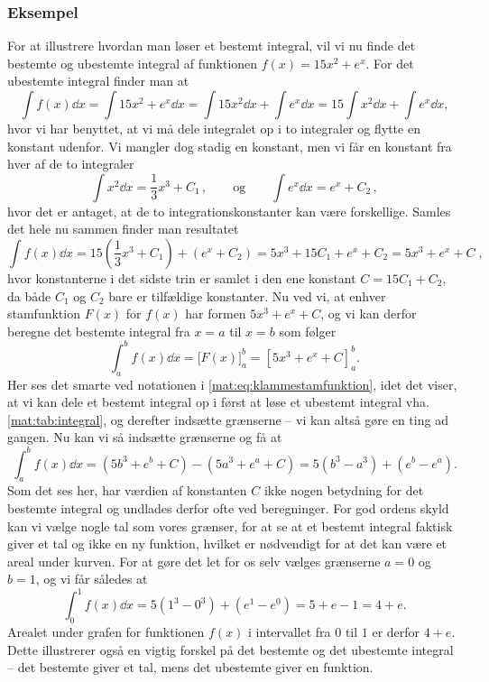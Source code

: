 \subsubsection{Eksempel}
For at illustrere hvordan man løser et bestemt integral, vil vi nu finde det bestemte og ubestemte integral af funktionen $f(x) = 15x^2 + e^x$. For det ubestemte integral finder man at
\begin{equation*}
\int f(x) \dd{x} = \int 15x^2 + e^x \dd{x} = \int 15x^2 \dd{x} + \int e^x \dd{x} = 15 \int x^2 \dd{x} + \int e^x \dd{x},
\end{equation*}
hvor vi har benyttet, at vi må dele integralet op i to integraler og flytte en konstant udenfor. Vi mangler dog stadig en konstant, men vi får en konstant fra hver af de to integraler
\begin{equation*}
\int x^2 \dd{x} = \frac{1}{3} x^3 + C_1 \, , \qquad \text{og} \qquad \int e^x \dd{x} = e^x + C_2 \, ,
\end{equation*}
hvor det er antaget, at de to integrationskonstanter kan være forskellige. Samles det hele nu sammen finder man resultatet
\begin{equation*}
\int f(x) \dd{x} = 15\left( \frac{1}{3} x^3 + C_1 \right) + \left( e^x + C_2 \right) = 5x^3 + 15C_1 + e^x + C_2 = 5x^3 + e^x + C \; ,
\end{equation*}
hvor konstanterne i det sidste trin er samlet i den ene konstant $C=15C_1+C_2$, da både $C_1$ og $C_2$ bare er tilfældige konstanter. Nu ved vi, at enhver stamfunktion $F(x)$ for $f(x)$ har formen $5x^3 + e^x + C$, og vi kan derfor beregne det bestemte integral fra $x=a$ til $x=b$ som følger
\begin{equation*}
\int_a^b f(x) \dd{x} = \Big[F(x)\Big]_ a^b = \left[ 5x^3 + e^x + C \right]_a^b.
\end{equation*}
Her ses det smarte ved notationen i \cref{mat:eq:klammestamfunktion}, idet det viser, at vi kan dele et bestemt integral op i først at løse et ubestemt integral vha. \cref{mat:tab:integral}, og derefter indsætte grænserne -- vi kan altså gøre en ting ad gangen. Nu kan vi så indsætte grænserne og få at
\begin{equation*}
    \int_a^b f(x) \dd{x} = \left( 5b^3 + e^b + C \right) - \left( 5a^3 + e^a + C \right) = 5 \left( b^3 - a^3 \right) + \left( e^b - e^a \right).
\end{equation*}
Som det ses her, har værdien af konstanten $C$ ikke nogen betydning for det bestemte integral og undlades derfor ofte ved beregninger. For god ordens skyld kan vi vælge nogle tal som vores grænser, for at se at et bestemt integral faktisk giver et tal og ikke en ny funktion, hvilket er nødvendigt for at det kan være et areal under kurven. For at gøre det let for os selv vælges grænserne $a=0$ og $b=1$, og vi får således at
\begin{equation*}
    \int_0^1 f(x) \dd{x} = 5 \left( 1^3 - 0^3 \right) + \left( e^1 - e^0 \right) = 5 + e - 1 = 4 + e.
\end{equation*}
Arealet under grafen for funktionen $f(x)$ i intervallet fra $0$ til $1$ er derfor $4+e$. Dette illustrerer også en vigtig forskel på det bestemte og det ubestemte integral -- det bestemte giver et tal, mens det ubestemte giver en funktion. \\

